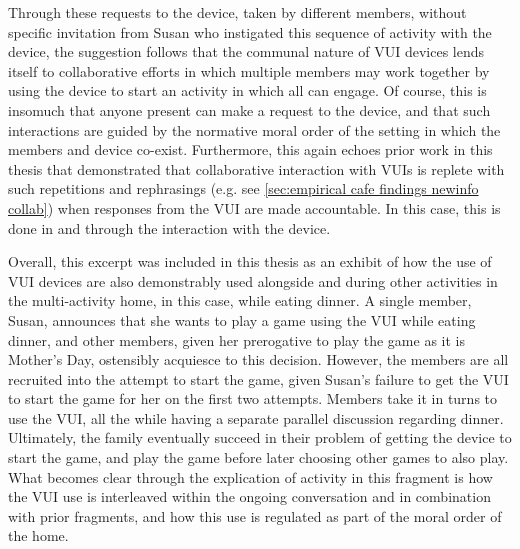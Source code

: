 \begin{revisedsubmission}
Through these requests to the device, taken by different members, without specific invitation from Susan who instigated this sequence of activity with the device, the suggestion follows that the communal nature of \ac{VUI} devices lends itself to collaborative efforts in which multiple members may work together by using the device to start an activity in which all can engage.
Of course, this is insomuch that anyone present can make a request to the device, and that such interactions are guided by the normative moral order of the setting in which the members and device co-exist.
Furthermore, this again echoes prior work in this thesis that demonstrated that collaborative interaction with \acp{VUI} is replete with such repetitions and rephrasings (e.g. see \ref{sec:empirical cafe findings newinfo collab}) when responses from the \ac{VUI} are made accountable.
In this case, this is done in and through the interaction with the device.

Overall, this excerpt was included in this thesis as an exhibit of how the use of \ac{VUI} devices are also demonstrably used alongside and during other activities in the multi-activity home, in this case, while eating dinner.
A single member, Susan, announces that she wants to play a game using the \ac{VUI} while eating dinner, and other members, given her prerogative to play the game as it is Mother's Day, ostensibly acquiesce to this decision.
However, the members are all recruited into the attempt to start the game, given Susan's failure to get the \ac{VUI} to start the game for her on the first two attempts.
Members take it in turns to use the \ac{VUI}, all the while having a separate parallel discussion regarding dinner.
Ultimately, the family eventually succeed in their problem of getting the device to start the game, and play the game before later choosing other games to also play.
What becomes clear through the explication of activity in this fragment is how the \ac{VUI} use is interleaved within the ongoing conversation and in combination with prior fragments, and how this use is regulated as part of the moral order of the home.
\end{revisedsubmission}





